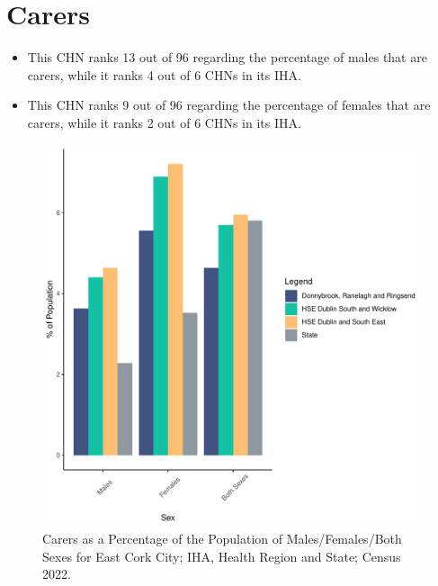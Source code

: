 \documentclass{article}
\begin{document}
\section{Carers}\label{sect:Carers}
\begin{itemize}
\item This CHN ranks  13 out of 96 regarding the percentage of males that are carers, while it ranks   4 out of 6 CHNs in its IHA.
\item This CHN ranks  9 out of 96 regarding the percentage of females that are carers, while it ranks   2 out of 6 CHNs in its IHA.
\end{itemize}
\begin{figure}[H]
	\centering
	\includegraphics[width = 150mm]{../figures/CareED.pdf}
	\caption{Carers as a Percentage of the Population of Males/Females/Both Sexes for East Cork City; IHA, Health Region and State; Census 2022.}
	\label{fig:2ae19629-1a6a-13a3-e055-000000000001}
	\end{figure}
\end{document}
